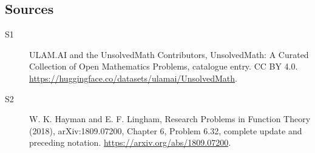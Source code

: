 \documentclass[11pt]{article}
\begin{document}
\subsection{Sources}
\begin{description}
\item[\hypertarget{source:statement:1}{S1}] ULAM.AI and the UnsolvedMath Contributors, UnsolvedMath: A Curated Collection of Open Mathematics Problems, catalogue entry. CC BY 4.0. \url{https://huggingface.co/datasets/ulamai/UnsolvedMath}.
\item[\hypertarget{source:statement:2}{S2}] W. K. Hayman and E. F. Lingham, Research Problems in Function Theory (2018), arXiv:1809.07200, Chapter 6, Problem 6.32, complete update and preceding notation. \url{https://arxiv.org/abs/1809.07200}.
\end{description}
\label{end:statement}
\end{document}
